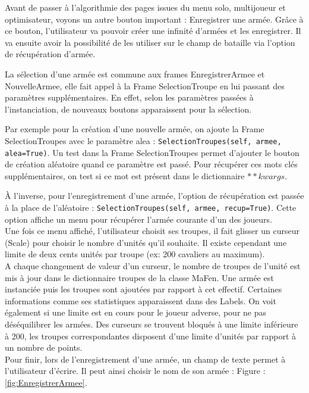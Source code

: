 \documentclass[a4paper]{article} %
\begin{document}
Avant de passer à l'algorithmie des pages issues du menu solo, multijoueur et optimisateur, voyons un autre bouton important : Enregistrer une armée. Grâce à ce bouton, l'utilisateur va pouvoir créer une infinité d'armées et les enregistrer.
Il va ensuite avoir la possibilité de les utiliser sur le champ de bataille via l'option de récupération d'armée.

La sélection d'une armée est commune aux frames EnregistrerArmee et NouvelleArmee, elle fait appel à la Frame SelectionTroupe en lui passant des paramètres supplémentaires.
En effet, selon les paramètres passées à l'instanciation, de nouveaux boutons apparaissent pour la sélection. 

Par exemple pour la création d'une nouvelle armée, on ajoute la Frame SelectionTroupes avec le paramètre alea : \texttt{SelectionTroupes(self, armee, alea=True)}. Un test dans la Frame SelectionTroupes permet d'ajouter le bouton de création aléatoire quand ce paramètre est passé. Pour récupérer ces mots clés supplémentaires, on test si ce mot est présent dans le dictionnaire $**kwargs$.

À l'inverse, pour l'enregistrement d'une armée, l'option de récupération est passée à la place de l'aléatoire : \texttt{SelectionTroupes(self, armee, recup=True)}. Cette option affiche un menu pour récupérer l'armée courante d'un des joueurs.\\

Une fois ce menu affiché, l'utilisateur choisit ses troupes, il fait glisser un curseur (Scale) pour choisir le nombre d'unités qu'il souhaite. Il existe cependant une limite de deux cents unités par troupe (ex: 200 cavaliers au maximum).
\\
A chaque changement de valeur d'un curseur, le nombre de troupes de l'unité est mis à jour dans le dictionnaire troupes de la classe MaFen. Une armée est instanciée puis les troupes sont ajoutées par rapport à cet effectif. Certaines informations comme ses statistiques apparaissent dans des Labels. On voit également si une limite est en cours pour le joueur adverse, pour ne pas déséquilibrer les armées. Des curseurs se trouvent bloqués à une limite inférieure à 200, les troupes correspondantes disposent d'une limite d'unités par rapport à un nombre de points.\\

Pour finir, lors de l'enregistrement d'une armée, un champ de texte permet à l'utilisateur d'écrire. Il peut ainsi choisir le nom de son armée : Figure : \ref{fig:EnregistrerArmee}.
\end{document}
